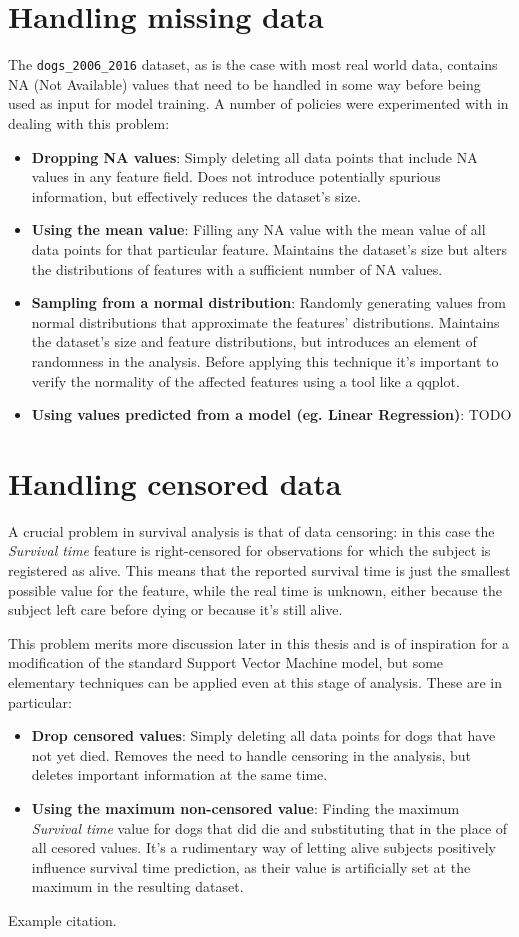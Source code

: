 \documentclass[12pt]{report}
\begin{document}
\section{Handling missing data}
The \texttt{dogs\_2006\_2016} dataset, as is the case with most real world data, contains NA (Not Available) values that need to be handled in some way before being used as input for model training. A number of policies were experimented with in dealing with this problem:
\begin{itemize}
\item \textbf{Dropping NA values}: Simply deleting all data points that include NA values in any feature field. Does not introduce potentially spurious information, but effectively reduces the dataset's size.
\item \textbf{Using the mean value}: Filling any NA value with the mean value of all data points for that particular feature. Maintains the dataset's size but alters the distributions of features with a sufficient number of NA values.
\item \textbf{Sampling from a normal distribution}: Randomly generating values from normal distributions that approximate the features' distributions. Maintains the dataset's size and feature distributions, but introduces an element of randomness in the analysis. Before applying this technique it's important to verify the normality of the affected features using a tool like a qqplot.
\item \textbf{Using values predicted from a model (eg. Linear Regression)}: TODO
\end{itemize}

\section{Handling censored data}
A crucial problem in survival analysis is that of data censoring: in this case the \textit{Survival time} feature is right-censored for observations for which the subject is registered as alive. This means that the reported survival time is just the smallest possible value for the feature, while the real time is unknown, either because the subject left care before dying or because it's still alive.

This problem merits more discussion later in this thesis and is of inspiration for a modification of the standard Support Vector Machine model, but some elementary techniques can be applied even at this stage of analysis. These are in particular:
\begin{itemize}
\item \textbf{Drop censored values}: Simply deleting all data points for dogs that have not yet died. Removes the need to handle censoring in the analysis, but deletes important information at the same time. \item \textbf{Using the maximum non-censored value}: Finding the maximum \textit{Survival time} value for dogs that did die and substituting that in the place of all cesored values. It's a rudimentary way of letting alive subjects positively influence survival time prediction, as their value is artificially set at the maximum in the resulting dataset.
\end{itemize}

%
%
\begin{thebibliography}{00}
%
Example citation.

%
\end{thebibliography}
% 
\end{document}
